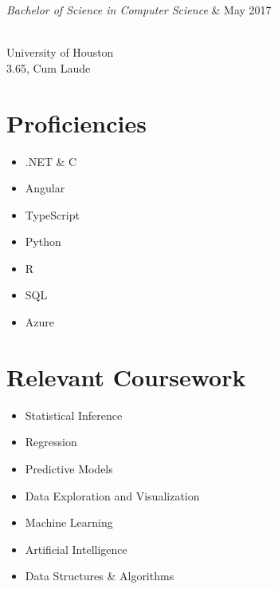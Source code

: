 \documentclass{res}
\begin{document}
{\begin{resume}
\begin{ncolumn}{2}
  {\it Bachelor of Science in Computer Science}  &   {\hspace*{\fill} May 2017}
\end{ncolumn}\\
University of Houston\\
3.65, Cum Laude

\begin{multicols}{2}
  \section{\bf Proficiencies}
  \begin{itemize}[noitemsep]
    \item .NET \& C\musSharp{}
    \item Angular
    \item TypeScript
    \item Python
    \item R
    \item SQL
    \item Azure
  \end{itemize}
  
  \section{\bf Relevant Coursework}
  \begin{itemize}[noitemsep]
    \item Statistical Inference
    \item Regression
    \item Predictive Models
    \item Data Exploration and Visualization
    \item Machine Learning
    \item Artificial Intelligence
    \item Data Structures \& Algorithms
  \end{itemize}
\end{multicols}

\end{resume}

\vfill}
\end{document}
